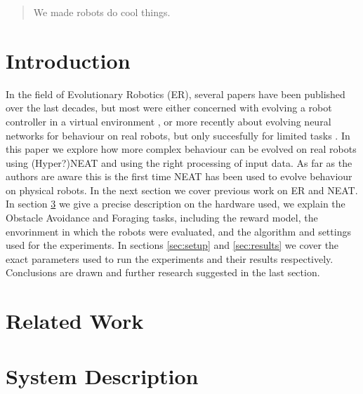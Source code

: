 \documentclass{article}
\begin{document}
	\maketitle
	\begin{abstract}
		We made robots do cool things.
	\end{abstract}

	\section{Introduction} %
	\label{sec:Introduction}
	In the field of Evolutionary Robotics (ER), several papers have been
	published over the last decades, but most were either concerned
	with evolving a robot controller in a virtual environment
	\cite{silva2015case, simoes1999evolutionary, sims1994evolving}, or more
	recently about evolving neural networks for behaviour on real robots, but
	only succesfully for limited tasks \cite{heinermanevolution,
	watson1999embodied}. In this paper we explore how more complex behaviour
	can be evolved on real robots using (Hyper?)NEAT \cite{stanley2002evolving}
	and using the right processing of input data. As far as the authors are
	aware this is the first time NEAT has been used to evolve behaviour on
	physical robots.
	In the next section we cover previous work on ER and NEAT. In section
	\ref{sec:method} we give a precise description on the hardware used, we
	explain the Obstacle Avoidance and Foraging tasks, including the reward
	model, the envorinment in which the robots were evaluated, and the
	algorithm and settings used for the experiments.
	In sections \ref{sec:setup} and \ref{sec:results} we cover the exact
	parameters used to run the experiments and their results respectively.
	Conclusions are drawn and further research suggested in the last section.

	\section{Related Work} %
	\label{sec:Related Work}
	\cite{heinermanevolution}
	\cite{silva2012odneat}
	\cite{stanley2002evolving, stanley2009hypercube, stanley2006real}

	\section{System Description} %
	\label{sec:method}
\end{document}
